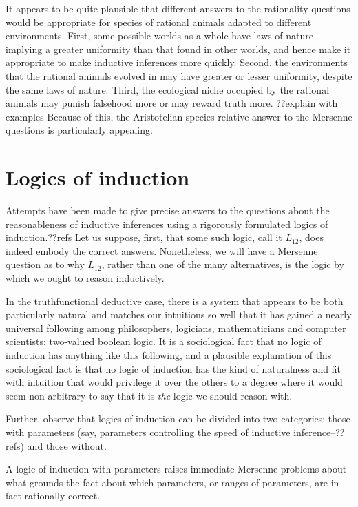 It appears to be quite plausible that different answers to the rationality questions would be appropriate
for species of rational animals adapted to different environments. First, some possible worlds as a whole have 
laws of nature implying a greater uniformity than that found in other worlds, and hence make it appropriate to make 
inductive inferences more quickly. Second, the environments that the rational animals evolved in may have greater or 
lesser uniformity, despite the same laws of nature. Third, the ecological niche occupied by the rational animals may
punish falsehood more or may reward truth more. ??explain with examples  Because of this, the Aristotelian 
species-relative answer to the Mersenne questions is particularly appealing.

\section{Logics of induction}
Attempts have been made to give precise answers to the questions about the reasonableness of inductive 
inferences using a rigorously formulated logics of induction.??refs Let us suppose, first, that some such
logic, call it $L_{12}$, does indeed embody the correct answers. Nonetheless, we will have a Mersenne question
as to why $L_{12}$, rather than one of the many alternatives, is the logic by which we ought to reason 
inductively. 

In the truthfunctional deductive case, there is a system that appears to be both particularly natural and matches
our intuitions so well that it has gained a nearly universal following among philosophers, logicians, mathematicians
and computer scientists: two-valued boolean logic. It is a sociological fact that no logic of induction has anything
like this following, and a plausible explanation of this sociological fact is that no logic of induction has the kind
of naturalness and fit with intuition that would privilege it over the others to a degree where it would seem
non-arbitrary to say that it is \textit{the} logic we should reason with.

Further, observe that logics of induction can be divided into two categories: those with parameters (say, 
parameters controlling the speed of inductive inference--??refs) and those without. 

A logic of induction with parameters raises immediate Mersenne problems about what grounds the fact about which 
parameters, or ranges of parameters, are in fact rationally correct. 

